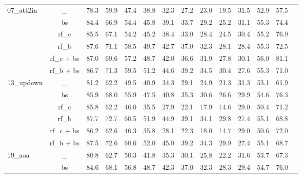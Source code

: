 \documentclass[journal,comsoc]{IEEEtran}
\begin{document}
\begin{table*}[htp]
\begin{tabular}{l|c|cccccccccccc}
\multirow{6}{*}{07\_att2in}       & \_         & 78.3    & 59.9    & 47.4    & 38.8    & 32.3    & 27.2    & 23.0    & 19.5    & 31.5   & 52.9     & 57.5  \\
                                  & bs         & 84.4    & 66.9    & 54.4    & 45.8    & 39.1    & 33.7    & 29.2    & 25.2    & 31.1   & 55.3     & 74.4  \\
                                  & rf\_c      & 85.5    & 67.1    & 54.2    & 45.2    & 38.4    & 33.0    & 28.4    & 24.5    & 30.4   & 55.2     & 76.9  \\
                                  & rf\_b      & 87.6    & 71.1    & 58.5    & 49.7    & 42.7    & 37.0    & 32.3    & 28.1    & 28.4   & 55.3     & 72.5  \\
                                  & rf\_c + bs & 87.0    & 69.6    & 57.2    & 48.7    & 42.0    & 36.6    & 31.9    & 27.8    & 30.1   & 56.0     & 81.1  \\
                                  & rf\_b + bs & 86.7    & 71.3    & 59.5    & 51.2    & 44.6    & 39.2    & 34.5    & 30.4    & 27.6   & 55.3     & 71.0  \\
\multirow{6}{*}{13\_updown}       & \_         & 81.2    & 62.2    & 49.5    & 40.9    & 34.3    & 29.1    & 24.9    & 21.3    & 31.3   & 53.1     & 61.9  \\
                                  & bs         & 85.9    & 68.0    & 55.9    & 47.5    & 40.8    & 35.3    & 30.6    & 26.6    & 29.9   & 54.6     & 76.3  \\
                                  & rf\_c      & 85.8    & 62.2    & 46.0    & 35.5    & 27.9    & 22.1    & 17.9    & 14.6    & 29.0   & 50.4     & 71.2  \\
                                  & rf\_b      & 87.7    & 72.7    & 60.5    & 51.9    & 44.9    & 39.1    & 34.1    & 29.8    & 27.4   & 55.1     & 68.8  \\
                                  & rf\_c + bs & 86.2    & 62.6    & 46.3    & 35.8    & 28.1    & 22.3    & 18.0    & 14.7    & 29.0   & 50.6     & 72.0  \\
                                  & rf\_b + bs & 87.5    & 72.6    & 60.6    & 52.0    & 45.0    & 39.2    & 34.3    & 29.9    & 27.4   & 55.1     & 68.7  \\
\multirow{6}{*}{19\_aoa}          & \_         & 80.8    & 62.7    & 50.3    & 41.8    & 35.3    & 30.1    & 25.8    & 22.2    & 31.6   & 53.7     & 67.3  \\
                                  & bs         & 84.6    & 68.1    & 56.8    & 48.7    & 42.3    & 37.0    & 32.3    & 28.3    & 29.4   & 54.7     & 76.0  \\

\end{tabular}
\end{table*}
\end{document}
